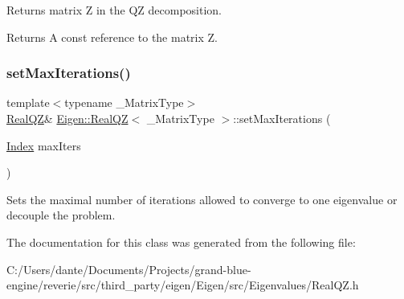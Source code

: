Returns matrix Z in the QZ decomposition. 

\begin{DoxyReturn}{Returns}
A const reference to the matrix Z. 
\end{DoxyReturn}
\mbox{\label{class_eigen_1_1_real_q_z_a30ae65666b1757e4a2b6a28eaec12226}} 
\subsubsection{\texorpdfstring{setMaxIterations()}{setMaxIterations()}}
{\footnotesize\ttfamily template$<$typename \+\_\+\+Matrix\+Type$>$ \\
\mbox{\hyperlink{class_eigen_1_1_real_q_z}{Real\+QZ}}\& \mbox{\hyperlink{class_eigen_1_1_real_q_z}{Eigen\+::\+Real\+QZ}}$<$ \+\_\+\+Matrix\+Type $>$\+::set\+Max\+Iterations (\begin{DoxyParamCaption}\item[{\mbox{\hyperlink{class_eigen_1_1_real_q_z_a6201e534e901b5f4e66f72c176b534a3}{Index}}}]{max\+Iters }\end{DoxyParamCaption})\hspace{0.3cm}{\ttfamily [inline]}}

Sets the maximal number of iterations allowed to converge to one eigenvalue or decouple the problem. 

The documentation for this class was generated from the following file\+:\begin{DoxyCompactItemize}
\item 
C\+:/\+Users/dante/\+Documents/\+Projects/grand-\/blue-\/engine/reverie/src/third\+\_\+party/eigen/\+Eigen/src/\+Eigenvalues/Real\+Q\+Z.\+h\end{DoxyCompactItemize}
